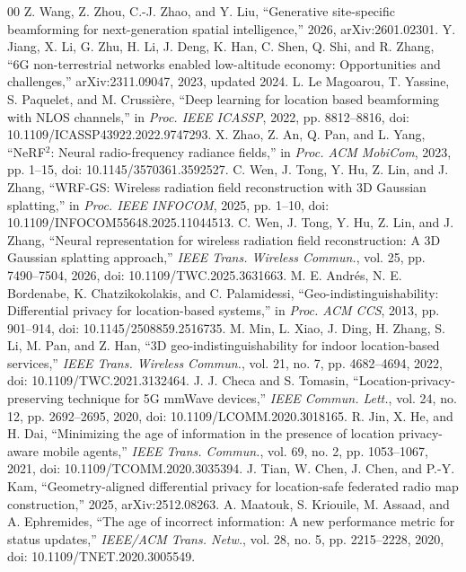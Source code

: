 \documentclass[conference]{IEEEtran}
\begin{document}
\begin{thebibliography}{00}
 Z. Wang, Z. Zhou, C.-J. Zhao, and Y. Liu, ``Generative site-specific beamforming for next-generation spatial intelligence,'' 2026, arXiv:2601.02301.
 Y. Jiang, X. Li, G. Zhu, H. Li, J. Deng, K. Han, C. Shen, Q. Shi, and R. Zhang, ``6G non-terrestrial networks enabled low-altitude economy: Opportunities and challenges,'' arXiv:2311.09047, 2023, updated 2024.
 L. Le Magoarou, T. Yassine, S. Paquelet, and M. Crussi\`ere, ``Deep learning for location based beamforming with NLOS channels,'' in \emph{Proc. IEEE ICASSP}, 2022, pp. 8812--8816, doi: 10.1109/ICASSP43922.2022.9747293.
 X. Zhao, Z. An, Q. Pan, and L. Yang, ``NeRF$^2$: Neural radio-frequency radiance fields,'' in \emph{Proc. ACM MobiCom}, 2023, pp. 1--15, doi: 10.1145/3570361.3592527.
 C. Wen, J. Tong, Y. Hu, Z. Lin, and J. Zhang, ``WRF-GS: Wireless radiation field reconstruction with 3D Gaussian splatting,'' in \emph{Proc. IEEE INFOCOM}, 2025, pp. 1--10, doi: 10.1109/INFOCOM55648.2025.11044513.
 C. Wen, J. Tong, Y. Hu, Z. Lin, and J. Zhang, ``Neural representation for wireless radiation field reconstruction: A 3D Gaussian splatting approach,'' \emph{IEEE Trans. Wireless Commun.}, vol. 25, pp. 7490--7504, 2026, doi: 10.1109/TWC.2025.3631663.
 M. E. Andr\'es, N. E. Bordenabe, K. Chatzikokolakis, and C. Palamidessi, ``Geo-indistinguishability: Differential privacy for location-based systems,'' in \emph{Proc. ACM CCS}, 2013, pp. 901--914, doi: 10.1145/2508859.2516735.
 M. Min, L. Xiao, J. Ding, H. Zhang, S. Li, M. Pan, and Z. Han, ``3D geo-indistinguishability for indoor location-based services,'' \emph{IEEE Trans. Wireless Commun.}, vol. 21, no. 7, pp. 4682--4694, 2022, doi: 10.1109/TWC.2021.3132464.
 J. J. Checa and S. Tomasin, ``Location-privacy-preserving technique for 5G mmWave devices,'' \emph{IEEE Commun. Lett.}, vol. 24, no. 12, pp. 2692--2695, 2020, doi: 10.1109/LCOMM.2020.3018165.
 R. Jin, X. He, and H. Dai, ``Minimizing the age of information in the presence of location privacy-aware mobile agents,'' \emph{IEEE Trans. Commun.}, vol. 69, no. 2, pp. 1053--1067, 2021, doi: 10.1109/TCOMM.2020.3035394.
 J. Tian, W. Chen, J. Chen, and P.-Y. Kam, ``Geometry-aligned differential privacy for location-safe federated radio map construction,'' 2025, arXiv:2512.08263.
 A. Maatouk, S. Kriouile, M. Assaad, and A. Ephremides, ``The age of incorrect information: A new performance metric for status updates,'' \emph{IEEE/ACM Trans. Netw.}, vol. 28, no. 5, pp. 2215--2228, 2020, doi: 10.1109/TNET.2020.3005549.

\end{thebibliography}
\end{document}
